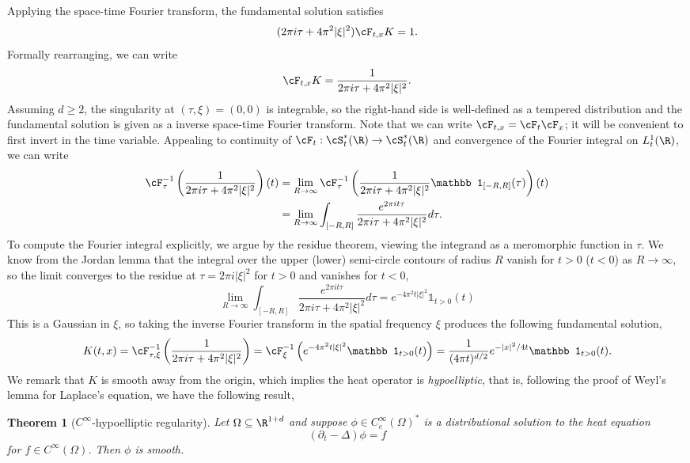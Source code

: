 \documentclass[reqno]{amsart}
\newtheorem{theorem}{Theorem}
\theoremstyle{definition}
\theoremstyle{remark}
\begin{document}
Applying the space-time Fourier transform, the fundamental solution satisfies 
	\[ (2\pi i \tau + 4\pi^2 |\xi|^2) \cF_{t, x} K = 1. \]
Formally rearranging, we can write
	\[ \cF_{t, x} K = \frac{1}{2\pi i \tau + 4\pi^2 |\xi|^2}.  \]
Assuming $d \geq 2$, the singularity at $(\tau, \xi) = (0, 0)$ is integrable, so the right-hand side is well-defined as a tempered distribution and the fundamental solution is given as a inverse space-time Fourier transform. Note that we can write $\cF_{t, x} = \cF_t \cF_x$; it will be convenient to first invert in the time variable. Appealing to continuity of $\cF_t : \cS^*_t (\R) \to \cS^*_t (\R)$ and convergence of the Fourier integral on $L^1_t (\R)$, we can write
	\begin{align*}
		\cF^{-1}_\tau \left(\frac{1}{2\pi i \tau + 4\pi^2 |\xi|^2} \right)(t) 
			&=
		\lim_{R \to \infty} \cF^{-1}_\tau \left( \frac{1}{2\pi i \tau + 4\pi^2 |\xi|^2} \mathbb 1_{[-R, R]} (\tau) \right) (t) \\
			&=			
			\lim_{R \to \infty} \int_{[-R, R]} \frac{e^{2\pi i t \tau}}{2\pi i \tau + 4\pi^2 |\xi|^2} d \tau.
		\end{align*} 	
	To compute the Fourier integral explicitly, we argue by the residue theorem, viewing the integrand as a meromorphic function in $\tau$. We know from the Jordan lemma that the integral over the upper (lower) semi-circle contours of radius $R$ vanish for $t > 0$ ($t < 0$) as $R \to \infty$, so the limit converges to the residue at $\tau = 2\pi i |\xi|^2$ for $t > 0$ and vanishes for $t < 0$,
		\[ \lim_{R \to \infty} \int_{[-R, R]} \frac{e^{2\pi i t \tau}}{2\pi i \tau + 4\pi^2 |\xi|^2} d \tau =   e^{- 4\pi^2 t |\xi|^2} \mathbb 1_{t > 0} (t) \]
	This is a Gaussian in $\xi$, so taking the inverse Fourier transform in the spatial frequency $\xi$ produces the following fundamental solution, 
	\[ K(t, x) = \cF^{-1}_{\tau, \xi}\left( \frac{1}{2\pi i\tau + 4\pi^2 |\xi|^2} \right) = \cF_{\xi}^{-1}\left(   e^{-4\pi^2 t |\xi|^2} \mathbb 1_{t > 0} (t) \right)   = \frac{1}{(4\pi t)^{d/2}} e^{-|x|^2/4t} \mathbb 1_{t > 0} (t). \]
We remark that $K$ is smooth away from the origin, which implies the heat operator is \textit{hypoelliptic}, that is, following the proof of Weyl's lemma for Laplace's equation, we have the following result, 
	
\begin{theorem}[$C^\infty$-hypoelliptic regularity]
	Let $\Omega \subseteq \R^{1 + d}$ and suppose $\phi \in C^\infty_c (\Omega)^*$ is a distributional solution to the heat equation 
		\[ (\partial_t - \Delta)\phi = f \]
	for $f \in C^\infty (\Omega)$. Then $\phi$ is smooth. 	
\end{theorem}
\end{document}
